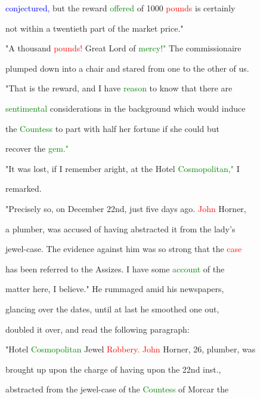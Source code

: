 \textcolor{blue}{conjectured,} but the \textcolor{BurntOrange}{reward} \textcolor{green}{offered} of 1000 \textcolor{red}{pounds} is certainly

 not within a twentieth part of the market price."



 "A thousand \textcolor{red}{pounds!} Great \textcolor{BurntOrange}{Lord} of \textcolor{green}{mercy!"} The commissionaire

 plumped down into a chair and \textcolor{BurntOrange}{stared} from one to the other of us.



 "That is the \textcolor{BurntOrange}{reward,} and I have \textcolor{green}{reason} to know that there are

 \textcolor{green}{sentimental} considerations in the background which would induce

 the \textcolor{green}{Countess} to part with half her \textcolor{BurntOrange}{fortune} if she could but

 recover the \textcolor{green}{gem."}



 "It was \textcolor{BurntOrange}{lost,} if I remember aright, at the Hotel \textcolor{green}{Cosmopolitan,"} I

 remarked.



 "Precisely so, on December 22nd, just five days ago. \textcolor{red}{John} Horner,

 a plumber, was accused of having abstracted it from the lady's

 jewel-case. The evidence against him was so strong that the \textcolor{red}{case}

 has been referred to the Assizes. I have some \textcolor{green}{account} of the

 matter here, I believe." He rummaged amid his newspapers,

 glancing over the dates, until at last he smoothed one out,

 doubled it over, and read the following paragraph:



 "Hotel \textcolor{green}{Cosmopolitan} Jewel \textcolor{red}{Robbery.} \textcolor{red}{John} Horner, 26, plumber, was

 brought up upon the charge of having upon the 22nd inst.,

 abstracted from the jewel-case of the \textcolor{green}{Countess} of Morcar the

